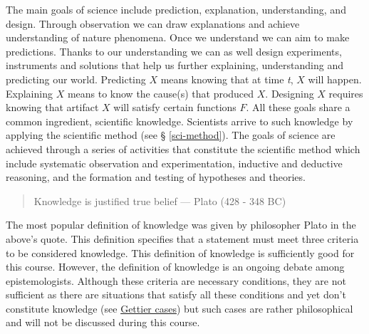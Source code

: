 \documentclass[
]{book}
\begin{document}
The main goals of science include prediction, explanation, understanding, and design. Through observation we can draw explanations and achieve understanding of nature phenomena. Once we understand we can aim to make predictions. Thanks to our understanding we can as well design experiments, instruments and solutions that help us further explaining, understanding and predicting our world. Predicting \(X\) means knowing that at time \emph{t}, \(X\) will happen. Explaining \(X\) means to know the cause(s) that produced \(X\). Designing \(X\) requires knowing that artifact \(X\) will satisfy certain functions \(F\). All these goals share a common ingredient, scientific knowledge. Scientists arrive to such knowledge by applying the scientific method (see § \ref{sci-method}). The goals of science are achieved through a series of activities that constitute the scientific method which include systematic observation and experimentation, inductive and deductive reasoning, and the formation and testing of hypotheses and theories.

\begin{quote}
Knowledge is justified true belief --- Plato (428 - 348 BC)
\end{quote}

The most popular definition of knowledge was given by philosopher Plato in the above's quote. This definition specifies that a statement must meet three criteria to be considered knowledge. This definition of knowledge is sufficiently good for this course. However, the definition of knowledge is an ongoing debate among epistemologists. Although these criteria are necessary conditions, they are not sufficient as there are situations that satisfy all these conditions and yet don't constitute knowledge (see \href{https://en.wikipedia.org/wiki/Gettier_case}{Gettier cases}) but such cases are rather philosophical and will not be discussed during this course.
\end{document}
